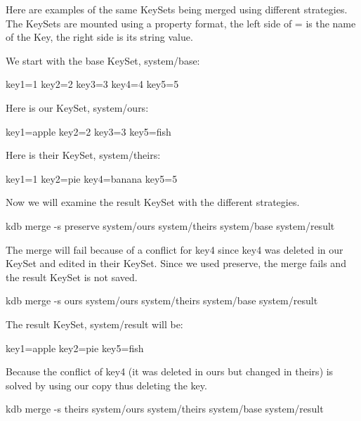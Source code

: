 Here are examples of the same Key\+Sets being merged using different strategies. The Key\+Sets are mounted using a property format, the left side of \textquotesingle{}=\textquotesingle{} is the name of the Key, the right side is its string value.

We start with the base Key\+Set, {\ttfamily system/base}\+:


\begin{DoxyCode}
key1=1
key2=2
key3=3
key4=4
key5=5
\end{DoxyCode}


Here is our Key\+Set, {\ttfamily system/ours}\+:


\begin{DoxyCode}
key1=apple
key2=2
key3=3
key5=fish
\end{DoxyCode}


Here is their Key\+Set, {\ttfamily system/theirs}\+:


\begin{DoxyCode}
key1=1
key2=pie
key4=banana
key5=5
\end{DoxyCode}


Now we will examine the result Key\+Set with the different strategies.


\begin{DoxyCode}
kdb merge -s preserve system/ours system/theirs system/base system/result
\end{DoxyCode}


The merge will fail because of a conflict for {\ttfamily key4} since {\ttfamily key4} was deleted in our Key\+Set and edited in their Key\+Set. Since we used preserve, the merge fails and the result Key\+Set is not saved.


\begin{DoxyCode}
kdb merge -s ours system/ours system/theirs system/base system/result
\end{DoxyCode}


The result Key\+Set, system/result will be\+:


\begin{DoxyCode}
key1=apple
key2=pie
key5=fish
\end{DoxyCode}


Because the conflict of {\ttfamily key4} (it was deleted in {\ttfamily ours} but changed in {\ttfamily theirs}) is solved by using our copy thus deleting the key.


\begin{DoxyCode}
kdb merge -s theirs system/ours system/theirs system/base system/result
\end{DoxyCode}


